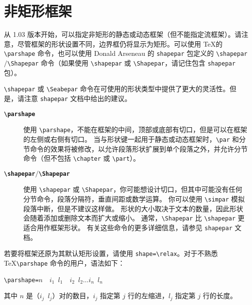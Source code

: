 \documentclass[a4paper]{book}%
\newcommand{\sty}[1]{\texttt{#1}}
\newcommand{\cmd}[1]{\texttt{#1}}
\begin{document}
\section{非矩形框架}\label{sec-3-1}%
从 1.03 版本开始，可以指定非矩形的静态或动态框架（但不能指定流框架）。请注意，尽管框架的形状设置不同，边界框仍将显示为矩形。可以使用 \TeX 的 \verb|\parshape| 命令，也可以使用 Donald Arseneau 的 \sty{shapepar} 包定义的 \verb|\shapepar|$/$\verb|\Shapepar| 命令（如果使用 \verb|\shapepar| 或 \verb|\Shapepar|，请记住包含 \sty{shapepar} 包）。

\verb|\shapepar| 或 \verb|\Seabepar| 命令在可使用的形状类型中提供了更大的灵活性。但是，请注意 \sty{shapepar} 文档中给出的建议。
\begin{description}
    \item[\textbf{\cmd{\textbackslash{parshape}}}] 使用 \verb|\parshape|，不能在框架的中间，顶部或底部有切口，但是可以在框架的左侧或右侧有切口。 当与形状键一起用于静态或动态框架时，\verb|\par| 和分节命令的效果将被修改，以允许段落形状扩展到单个段落之外，并允许分节命令（但不包括 \verb|\chapter| 或 \verb|\part|）。
    \item[\textbf{\cmd{\textbackslash{shapepar}}}$/$\textbf{\cmd{\textbackslash{Shapepar}}}] 使用 \verb|\shapepar| 或 \verb|\Shapepar|，你可能想设计切口，但其中可能没有任何分节命令，段落分隔符，垂直间距或数学运算。 你可以使用 \verb|\simpar| 模拟段落中断，但是不建议这样做。 形状的大小取决于文本的数量，因此形状会随着添加或删除文本而扩大或缩小。 通常，\verb|\Shapepar| 比 \verb|\shapepar| 更适合用作框架形状。 有关这些命令的更多详细信息，请参见 \sty{shapepar} 文档。
\end{description}
若要将框架还原为其默认矩形设置，请使用 \verb|shape=\relax|。对于不熟悉 \TeX\;\verb|\parshape| 命令的用户，语法如下：
\begin{mdframed}[backgroundcolor=white]
    \verb|\parshape=|$n$~~$i_1$~$l_1$~~$i_2$~$l_2\ldots i_n$~$l_n$
\end{mdframed}
其中 $n$ 是（$i_j$~$l_j$）对的数目，$i_j$ 指定第 $j$ 行的左缩进，$l_j$ 指定第 $j$ 行的长度。
\end{document}
